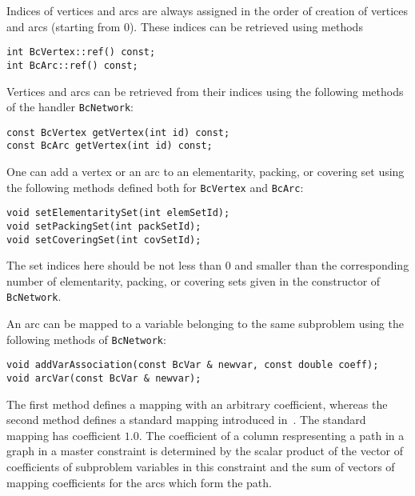 \documentclass[10pt,a4paper]{article}
\begin{document}
Indices of vertices and arcs are always assigned in the order of creation of vertices and arcs (starting from
$0$). These indices can be retrieved using methods
\begin{lstlisting}
int BcVertex::ref() const;
int BcArc::ref() const;
\end{lstlisting}
Vertices and arcs can be retrieved from their indices using the following methods of the handler \verb+BcNetwork+:
\begin{lstlisting}
const BcVertex getVertex(int id) const;
const BcArc getVertex(int id) const;
\end{lstlisting}

One can add a vertex or an arc to an elementarity, packing, or covering set using the following methods defined
both for \verb+BcVertex+ and \verb+BcArc+:
\begin{lstlisting}
void setElementaritySet(int elemSetId);
void setPackingSet(int packSetId);
void setCoveringSet(int covSetId);
\end{lstlisting}
The set indices here should be not less than $0$ and smaller than the corresponding number of elementarity, packing, or
covering sets given in the constructor of \verb+BcNetwork+.


An arc can be mapped to a variable belonging to the same subproblem using the following methods of \verb+BcNetwork+:
\begin{lstlisting}
void addVarAssociation(const BcVar & newvar, const double coeff);
void arcVar(const BcVar & newvar);
\end{lstlisting}
The first method defines a mapping with an arbitrary coefficient, whereas the second method defines a standard mapping
introduced in~\cite{PessoaSadykovUchoa:20a}. The standard mapping has coefficient $1.0$. The coefficient of a column
respresenting a path in a graph in a master constraint is determined by the scalar product of the vector of coefficients
of subproblem variables in this constraint and the sum of vectors of mapping coefficients for the arcs which form the
path.
\end{document}
